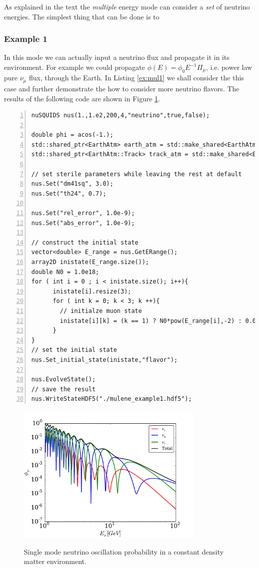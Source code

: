 \documentclass[3p,12pt,authoryear]{elsarticle}
\begin{document}
As explained in the text the {\it multiple} energy mode can consider a {\it set} of neutrino energies. The simplest thing that can be done is to 

\subsubsection{Example 1}

In this mode we can actually input a neutrino flux and propagate it in its environment. For example we could propagate $\phi(E) = \phi_0 E^{-1} \Pi_\mu$, i.e. power law pure $\nu_\mu$ flux, through the Earth. In Listing \ref{ex:mul1} we shall consider the this case and further demonstrate the how to consider more neutrino flavors. The results of the following code are shown in Figure \ref{fig:sterile_osc}.

\begin{lstlisting}[frame=leftline, numbers = left,breaklines=true, label = ex:mul1]
nuSQUIDS nus(1.,1.e2,200,4,"neutrino",true,false);

double phi = acos(-1.);
std::shared_ptr<EarthAtm> earth_atm = std::make_shared<EarthAtm>();
std::shared_ptr<EarthAtm::Track> track_atm = std::make_shared<EarthAtm::Track>(phi);

// set sterile parameters while leaving the rest at default
nus.Set("dm41sq", 3.0);
nus.Set("th24", 0.7);

nus.Set("rel_error", 1.0e-9);
nus.Set("abs_error", 1.0e-9);

// construct the initial state
vector<double> E_range = nus.GetERange();
array2D inistate(E_range.size());
double N0 = 1.0e18;
for ( int i = 0 ; i < inistate.size(); i++){
      inistate[i].resize(3);
      for ( int k = 0; k < 3; k ++){
        // initialze muon state
        inistate[i][k] = (k == 1) ? N0*pow(E_range[i],-2) : 0.0;
      }
}
// set the initial state
nus.Set_initial_state(inistate,"flavor");

nus.EvolveState();
// save the result
nus.WriteStateHDF5("./mulene_example1.hdf5");
\end{lstlisting}

\begin{figure}[h]
\begin{center}
\label{fig:sterile_osc}
\includegraphics[width=0.8\textwidth]{../fig/sterile_osc_demo.pdf}
\caption{Single mode neutrino oscillation probability in a constant density matter environment.}
\end{center}
\end{figure}
\end{document}
